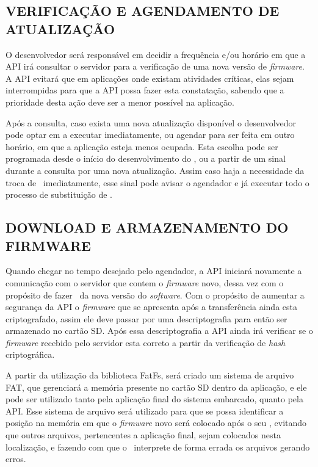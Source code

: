 
\subsection{VERIFICAÇÃO E AGENDAMENTO DE ATUALIZAÇÃO}

O desenvolvedor será responsável em decidir a frequência e/ou horário em que a API irá consultar o servidor para a verificação de uma nova versão de \textit{firmware}. A API evitará que em aplicações onde existam atividades críticas, elas sejam interrompidas para que a API possa fazer esta constatação, sabendo que a prioridade desta ação deve ser a menor possível na aplicação.

Após a consulta, caso exista uma nova atualização disponível o desenvolvedor pode optar em a executar imediatamente, ou agendar para ser feita em outro horário, em que a aplicação esteja menos ocupada. Esta escolha pode ser programada desde o início do desenvolvimento do \firmware, ou a partir de um sinal durante a consulta por uma nova atualização. Assim caso haja a necessidade da troca de \software\ imediatamente, esse sinal pode avisar o agendador e já executar todo o processo de substituição de \firmware. 

\subsection{DOWNLOAD E ARMAZENAMENTO DO FIRMWARE}

Quando chegar no tempo desejado pelo agendador, a API iniciará novamente a comunicação com o servidor que contem o \textit{firmware} novo, dessa vez com o propósito de fazer \download\ da nova versão do \textit{software}. Com o propósito de aumentar a segurança da API o \textit{firmware} que se apresenta após a transferência ainda esta criptografado, assim ele deve passar por uma descriptografia para então ser armazenado no cartão SD. Após essa descriptografia a API ainda irá verificar se o \textit{firmware} recebido pelo servidor esta correto a partir da verificação de \textit{hash} criptográfica. 

A partir da utilização da biblioteca FatFs, será criado um sistema de arquivo FAT, que gerenciará a memória presente no cartão SD dentro da aplicação, e ele pode ser utilizado tanto pela aplicação final do sistema embarcado, quanto pela API. Esse sistema de arquivo será utilizado para que se possa identificar a posição na memória em que o \textit{firmware} novo será colocado após o seu \download, evitando que outros arquivos, pertencentes a aplicação final, sejam colocados nesta localização, e fazendo com que o \bootloader\ interprete de forma errada os arquivos gerando erros.


